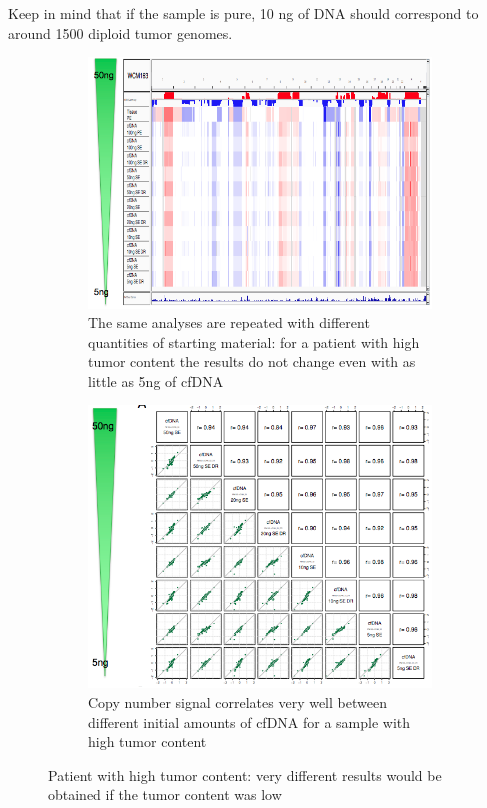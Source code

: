 Keep in mind that if the sample is pure, 10 ng of DNA should correspond to around 1500 diploid tumor genomes.

\begin{figure}[!ht]
\centering
\begin{subfigure}{.4\textwidth}
    \centering
    \includegraphics[width=\linewidth]{quantity1.png}
    \caption{The same analyses are repeated with different quantities of starting material: for a patient with high tumor content the results do not change even with as little as 5ng of cfDNA}
\end{subfigure}
%
\begin{subfigure}{.4\textwidth}
    \centering
    \includegraphics[width=\linewidth]{quantity2.png}
    \caption{Copy number signal correlates very well between different initial amounts of cfDNA for a sample with high tumor content}
\end{subfigure}
\caption{\label{fig:quan}Patient with high tumor content: very different results would be obtained if the tumor content was low}
\end{figure}



